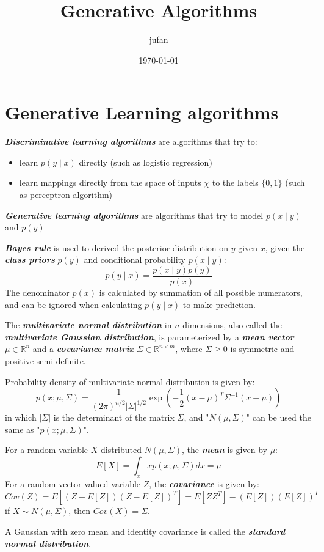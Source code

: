 \documentclass{article}
\begin{document}
\title{Generative Algorithms}\author{jufan}\date{\today}
\maketitle
\tableofcontents

\section{Generative Learning algorithms}
\emph{\textbf{Discriminative learning algorithms}} are algorithms that try to:
\begin{itemize}
  \item learn $p(y\mid x)$ directly (such as logistic regression)
  \item learn mappings directly from the space of inputs $\chi$ to the labels $\{0,1\}$ (such as perceptron algorithm)
\end{itemize}

\emph{\textbf{Generative learning algorithms}} are algorithms that try to model $p(x\mid y)$ and $p(y)$

\begin{spacing}{2}
\end{spacing}

\emph{\textbf{Bayes rule}} is used to derived the posterior distribution on $y$ given $x$, given the \emph{\textbf{class priors}} $p(y)$ and conditional probability $p(x\mid y)$:
\begin{equation*}
p(y\mid x) = \frac{p(x\mid y)p(y)}{p(x)}
\end{equation*}
The denominator $p(x)$ is calculated by summation of all possible numerators, and can be ignored when calculating $p(y\mid x)$ to make prediction.

The \emph{\textbf{multivariate normal distribution}} in $n$-dimensions, also called the \emph{\textbf{multivariate Gaussian distribution}}, is parameterized by a \emph{\textbf{mean vector}} $\mu\in\mathbb{R}^n$ and a \emph{\textbf{covariance matrix}} $\Sigma\in\mathbb{R}^{n\times m}$, where $\Sigma \geq 0$ is symmetric and positive semi-definite.

Probability density of multivariate normal distribution is given by:
\begin{equation*}
p(x;\mu,\Sigma)=\frac{1}{(2\pi)^{n/2}\lvert\Sigma\rvert^{1/2}}\exp\left(-\frac{1}{2}(x-\mu)^T\Sigma^{-1}(x-\mu)\right)
\end{equation*}
in which $\lvert\Sigma\rvert$ is the determinant of the matrix $\Sigma$, and "$N(\mu,\Sigma)$" can be used the same as "$p(x;\mu,\Sigma)$".

For a random variable $X$ distributed $N(\mu, \Sigma)$, the \emph{\textbf{mean}} is given by $\mu$:
\begin{equation*}
E[X]=\int_x xp(x;\mu,\Sigma)dx=\mu
\end{equation*}
For a random vector-valued variable $Z$, the \emph{\textbf{covariance}} is given by:
\begin{equation*}
Cov(Z)=E[(Z-E[Z])(Z-E[Z])^T]=E[ZZ^T]-(E[Z])(E[Z])^T
\end{equation*}
if $X\sim N(\mu,\Sigma)$, then $Cov(X)=\Sigma$.

A Gaussian with zero mean and identity covariance is called the \emph{\textbf{standard normal distribution}}.
\end{document}
